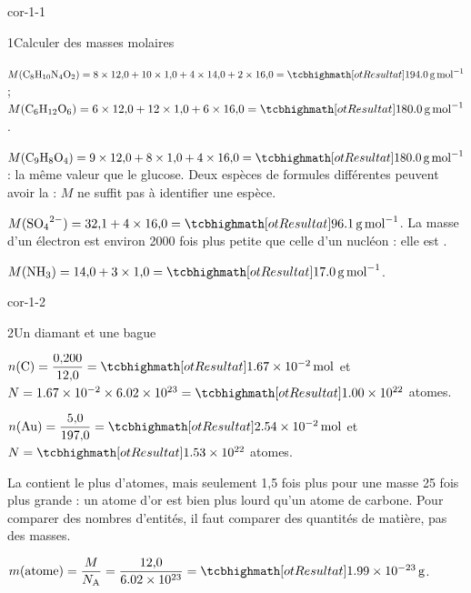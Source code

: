 \corrigesSouples

\begin{blocLivre}{cor-1-1}
\begin{corrige}{1}{Calculer des masses molaires}
\begin{questions}
\item $M(\ce{C8H10N4O2})=8\times12{,}0+10\times1{,}0+4\times14{,}0+2\times16{,}0=\res{\qty{194,0}{g.mol^{-1}}}$ ;
$M(\ce{C6H12O6})=6\times12{,}0+12\times1{,}0+6\times16{,}0=\res{\qty{180,0}{g.mol^{-1}}}$.
\item $M(\ce{C9H8O4})=9\times12{,}0+8\times1{,}0+4\times16{,}0=\res{\qty{180,0}{g.mol^{-1}}}$ : la même valeur que le glucose. Deux espèces de formules
différentes peuvent avoir la  : $M$ ne suffit pas à identifier une espèce.
\item $M(\ce{SO4^{2-}})=32{,}1+4\times16{,}0=\res{\qty{96,1}{g.mol^{-1}}}$. La masse d'un électron est environ \num{2000} fois plus petite que celle d'un
nucléon : elle est .
\item $M(\ce{NH3})=14{,}0+3\times1{,}0=\res{\qty{17,0}{g.mol^{-1}}}$.
\end{questions}
\end{corrige}
\end{blocLivre}
\begin{blocLivre}{cor-1-2}
\begin{corrige}{2}{Un diamant et une bague}
\begin{questions}
\item $n(\ce{C})=\dfrac{0{,}200}{12{,}0}=\res{\qty{1,67e-2}{mol}}$ et $N=\num{1.67e-2}\times\num{6.02e23}=\res{\num{1.00e22}}$ atomes.
\item $n(\ce{Au})=\dfrac{5{,}0}{197{,}0}=\res{\qty{2,54e-2}{mol}}$ et $N=\res{\num{1.53e22}}$ atomes.
\item La  contient le plus d'atomes, mais seulement 1,5 fois plus pour une masse 25 fois plus grande : un atome
d'or est bien plus lourd qu'un atome de carbone. Pour comparer des nombres d'entités, il faut comparer des quantités de
matière, pas des masses.
\item $m(\text{atome})=\dfrac{M}{N_\mathrm{A}}=\dfrac{12{,}0}{\num{6.02e23}}=\res{\qty{1,99e-23}{g}}$.
\end{questions}
\end{corrige}
\end{blocLivre}
